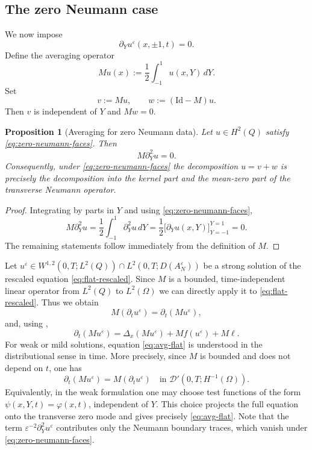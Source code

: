 \documentclass[11pt]{article}
\newtheorem{proposition}[theorem]{Proposition}
\theoremstyle{definition}
\theoremstyle{remark}
\numberwithin{equation}{section}
\newcommand{\eps}{\varepsilon}
\newcommand{\Q}{Q}
\newcommand{\Id}{\mathrm{Id}}
\begin{document}
\subsection{The zero Neumann case}

We now impose
\begin{equation}\label{eq:zero-neumann-faces}
\partial_Yu^\eps(x,\pm1,t)=0.
\end{equation}
Define the averaging operator
\begin{equation}\label{eq:M-def}
Mu(x):=\frac12\int_{-1}^1 u(x,Y)\,dY.
\end{equation}
Set
\[
v:=Mu,
\qquad
w:=(\Id-M)u.
\]
Then $v$ is independent of $Y$ and $Mw=0$.

\begin{proposition}[Averaging for zero Neumann data]\label{prop:neumann-averaging}
Let $u\in H^2(\Q)$ satisfy \eqref{eq:zero-neumann-faces}. Then
\[
M\partial_Y^2u = 0.
\]
Consequently, under \eqref{eq:zero-neumann-faces} the decomposition $u=v+w$ is precisely the decomposition into the kernel part and the mean-zero part of the transverse Neumann operator.
\end{proposition}

\begin{proof}
Integrating by parts in $Y$ and using \eqref{eq:zero-neumann-faces},
\[
M\partial_Y^2u = \frac12\int_{-1}^1 \partial_Y^2u\,dY
= \frac12\bigl[\partial_Yu(x,Y)\bigr]_{Y=-1}^{Y=1}=0.
\]
The remaining statements follow immediately from the definition of $M$.
\end{proof}

Let $u^\varepsilon\in W^{1,2}(0,T;L^2(Q)) \cap L^2(0,T;D(A^\varepsilon_N))$ be a strong solution of the rescaled equation \eqref{eq:flat-rescaled}. 
Since \(M\) is a bounded, time-independent linear operator from \(L^2(Q)\) to \(L^2(\Omega)\) we can directly apply it to \eqref{eq:flat-rescaled}.
Thus we obtain
\[
  M(\partial_t u^\varepsilon)=\partial_t(Mu^\varepsilon),
\]
and, using ,
\begin{equation}\label{eq:avg-flat}
  \partial_t(Mu^\varepsilon)   =   \Delta_x(Mu^\varepsilon)   +M f(u^\varepsilon)   +M\ell .
\end{equation}
For weak or mild solutions, equation \eqref{eq:avg-flat} is understood in the
distributional sense in time. 
More precisely, since \(M\) is bounded and does not depend on \(t\), one has
\[
  \partial_t(Mu^\varepsilon)=M(\partial_tu^\varepsilon)
  \quad\text{in } \mathcal D'(0,T;H^{-1}(\Omega)).
\]
Equivalently, in the weak formulation one may choose test functions of the form \(\psi(x,Y,t)=\varphi(x,t)\), independent of \(Y\). 
This choice projects the full equation onto the transverse zero mode and gives precisely
\eqref{eq:avg-flat}.
Note that the term \(\varepsilon^{-2}\partial_Y^2u^\varepsilon\) contributes only the Neumann
boundary traces, which vanish under \eqref{eq:zero-neumann-faces}.
\end{document}

